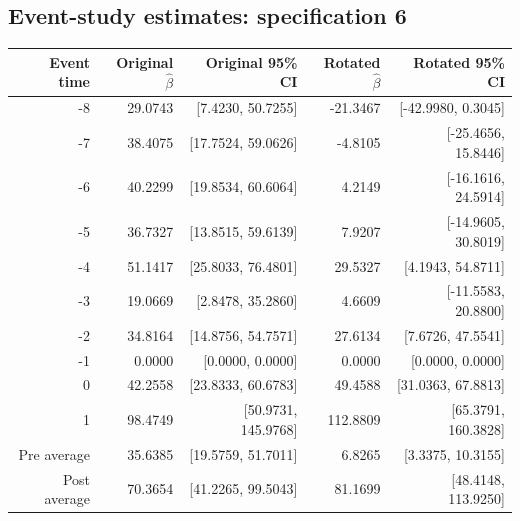 \documentclass[10pt]{article}
\begin{document}
\subsection*{Event-study estimates: specification 6}
\begin{center}\scriptsize
\begin{tabular}{r rr rr}
\toprule
Event time & Original $\hat\beta$ & Original 95\% CI & Rotated $\hat\beta$ & Rotated 95\% CI \\
\midrule
-8 & 29.0743 & [7.4230, 50.7255] & -21.3467 & [-42.9980, 0.3045] \\
-7 & 38.4075 & [17.7524, 59.0626] & -4.8105 & [-25.4656, 15.8446] \\
-6 & 40.2299 & [19.8534, 60.6064] & 4.2149 & [-16.1616, 24.5914] \\
-5 & 36.7327 & [13.8515, 59.6139] & 7.9207 & [-14.9605, 30.8019] \\
-4 & 51.1417 & [25.8033, 76.4801] & 29.5327 & [4.1943, 54.8711] \\
-3 & 19.0669 & [2.8478, 35.2860] & 4.6609 & [-11.5583, 20.8800] \\
-2 & 34.8164 & [14.8756, 54.7571] & 27.6134 & [7.6726, 47.5541] \\
-1 & 0.0000 & [0.0000, 0.0000] & 0.0000 & [0.0000, 0.0000] \\
0 & 42.2558 & [23.8333, 60.6783] & 49.4588 & [31.0363, 67.8813] \\
1 & 98.4749 & [50.9731, 145.9768] & 112.8809 & [65.3791, 160.3828] \\
\midrule
Pre average & 35.6385 & [19.5759, 51.7011] & 6.8265 & [3.3375, 10.3155] \\
Post average & 70.3654 & [41.2265, 99.5043] & 81.1699 & [48.4148, 113.9250] \\
\bottomrule
\end{tabular}
\end{center}
\clearpage
\end{document}

